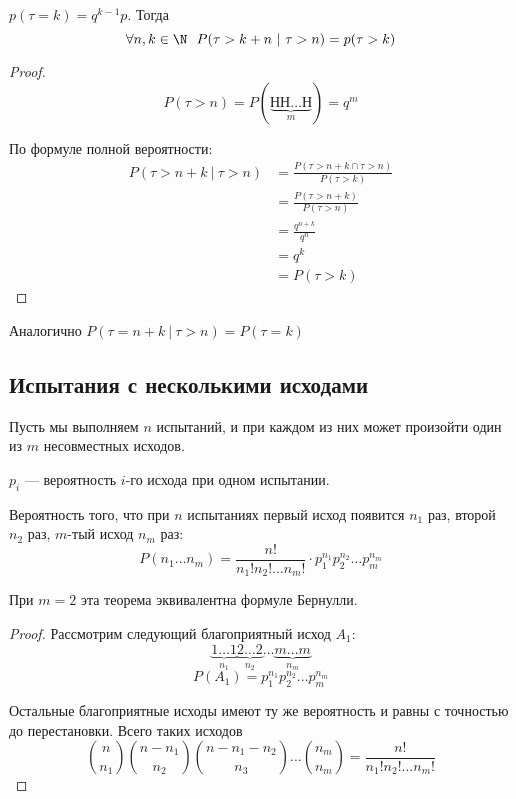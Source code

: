 \begin{theorem}
    \(p(\tau = k) = q^{k - 1}p\). Тогда
    \[\forall n,k\in\N \ \ P(\tau > k + n\ |\ \tau > n) = p(\tau > k)\]
\end{theorem}
\begin{proof}
    \[P(\tau > n) = P(\underbrace{\text{НН}\dots\text{Н}}_{m})= q^m\]

    По формуле полной вероятности:
    \begin{align*}
        P(\tau > n + k\ |\ \tau > n) & = \frac{P(\tau > n + k \cap \tau > n)}{P(\tau > k)} \\
                                     & = \frac{P(\tau > n + k)}{P(\tau > n)}               \\
                                     & = \frac{q^{n + k}}{q^n}                             \\
                                     & = q^k                                               \\
                                     & = P(\tau > k)
    \end{align*}
\end{proof}

\begin{remark}
    Аналогично \(P(\tau = n + k\ |\ \tau > n) = P(\tau = k)\)
\end{remark}

\subsection{Испытания с несколькими исходами}

Пусть мы выполняем \(n\) испытаний, и при каждом из них может произойти один из \(m\) несовместных исходов.
\begin{obozn}
    \(p_i\) --- вероятность \(i\)-го исхода при одном испытании.
\end{obozn}

\begin{theorem}
    Вероятность того, что при \(n\) испытаниях первый исход появится \(n_1\) раз, второй \(n_2\) раз, \(m\)-тый исход \(n_m\) раз:
    \[P(n_1 \dots n_m) = \frac{n!}{n_1!n_2! \dots n_m!} \cdot p_1^{n_1} p_2^{n_2} \dots p_m^{n_m}\]
\end{theorem}

\begin{remark}
    При \(m = 2\) эта теорема эквивалентна формуле Бернулли.
\end{remark}

\begin{proof}
    Рассмотрим следующий благоприятный исход \(A_1\):
    \[\underbrace{1\dots 1}_{n_1} \underbrace{2\dots 2}_{n_2} \dots \underbrace{m\dots m}_{n_m}\]
    \[P(A_1) = p_1^{n_1} p_2^{n_2} \dots p_m^{n_m}\]

    Остальные благоприятные исходы имеют ту же вероятность и равны с точностью до перестановки. Всего таких исходов
    \[\binom{n}{n_1}\binom{n - n_1}{n_2}\binom{n - n_1 - n_2}{n_3} \dots \binom{n_m}{n_m} = \frac{n!}{n_1!n_2! \dots n_m!}\]
\end{proof}

